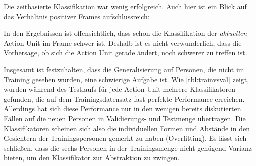 Die zeitbasierte Klassifikation war wenig erfolgreich. Auch hier ist ein Blick
auf das Verhältnis positiver Frames aufschlussreich:

In den Ergebnissen ist offensichtlich, dass schon die Klassifikation der
\emph{aktuellen} Action Unit im Frame schwer ist. Deshalb ist es nicht verwunderlich,
dass die Vorhersage, ob sich die Action Unit gerade ändert, noch schwerer zu
treffen ist.

Insgesamt ist festzuhalten, dass die Generalisierung auf Personen, die nicht im
Training gesehen wurden, eine schwierige Aufgabe ist. Wie \cref{tbl:trainvsval}
zeigt, wurden während des Testlaufs für jede Action Unit mehrere Klassifikatoren
gefunden, die auf dem Trainingsdatensatz fast perfekte Performance erreichen.
Allerdings hat sich diese Performance nur in den wenigen bereits diskutierten Fällen
auf die neuen Personen in Validierungs- und Testmenge übertragen. Die
Klassifikatoren scheinen sich also die individuellen Formen und Abstände in den Gesichtern
der Trainingspersonen gemerkt zu haben (Overfitting). Es lässt sich schließen,
dass die sechs Personen in der Trainingsmenge nicht genügend Varianz bieten, um
den Klassifikator zur Abstraktion zu zwingen.



